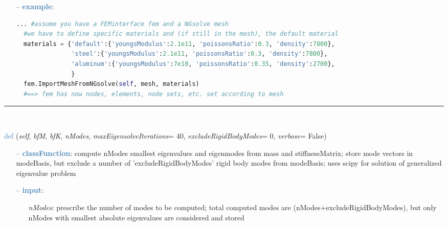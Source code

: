 \begin{itemize}[leftmargin=1.4cm]
\begin{itemize}[leftmargin=1.4cm]
\begin{itemize}[leftmargin=1.4cm]
\begin{itemize}[leftmargin=0.5cm]
\begin{itemize}[leftmargin=1.4cm]
\begin{itemize}[leftmargin=1.4cm]
\begin{itemize}[leftmargin=1.4cm]
\begin{itemize}[leftmargin=0.5cm]
\begin{itemize}[leftmargin=0.7cm]
\begin{itemize}[leftmargin=1.2cm]
\end{itemize}
\item[--]\textcolor{steelblue}{\bf example}: \vspace{-12pt}\ei\begin{lstlisting}[language=Python, xleftmargin=36pt]
  ... #assume you have a FEMinterface fem and a NGsolve mesh
  #we have to define specific materials and (if still in the mesh), the default material
  materials = {'default':{'youngsModulus':2.1e11, 'poissonsRatio':0.3, 'density':7800},
               'steel':{'youngsModulus':2.1e11, 'poissonsRatio':0.3, 'density':7800},
               'aluminum':{'youngsModulus':7e10, 'poissonsRatio':0.35, 'density':2700},
               }
  fem.ImportMeshFromNGsolve(self, mesh, materials)
  #==> fem has now nodes, elements, node sets, etc. set according to mesh
\end{lstlisting}\vspace{-24pt}\bi\item[]\vspace{-24pt}\vspace{12pt}\end{itemize}
%
\noindent\rule{8cm}{0.75pt}\vspace{1pt} \\ 
\begin{flushleft}
\noindent \textcolor{steelblue}{def {\bf {}}}\label{sec:FEM:FEMinterface:ComputeEigenmodesNGsolve}
({\it self}, {\it bfM}, {\it bfK}, {\it nModes}, {\it maxEigensolveIterations}= 40, {\it excludeRigidBodyModes}= 0, {\it verbose}= False)
\end{flushleft}
\setlength{\itemindent}{0.7cm}
\begin{itemize}[leftmargin=0.7cm]
\item[--]\textcolor{steelblue}{\bf classFunction}: compute nModes smallest eigenvalues and eigenmodes from mass and stiffnessMatrix; store mode vectors in modeBasis, but exclude a number of 'excludeRigidBodyModes' rigid body modes from modeBasis; uses scipy for solution of generalized eigenvalue problem
\item[--]\textcolor{steelblue}{\bf input}: \vspace{-6pt}
\begin{itemize}[leftmargin=1.2cm]
\setlength{\itemindent}{-0.7cm}
\item[]{\it nModes}: prescribe the number of modes to be computed; total computed modes are  (nModes+excludeRigidBodyModes), but only nModes with smallest absolute eigenvalues are considered and stored

\end{itemize}
\end{itemize}
\end{itemize}
\end{itemize}
\end{itemize}
\end{itemize}
\end{itemize}
\end{itemize}
\end{itemize}
\end{itemize}
